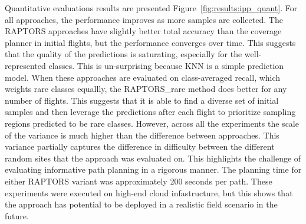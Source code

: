 Quantitative evaluations results are presented Figure~\ref{fig:results:ipp_quant}. For all approaches, the performance improves as more samples are collected. The RAPTORS approaches have slightly better total accuracy than the coverage planner in initial flights, but the performance converges over time. This suggests that the quality of the predictions is saturating, especially for the well-represented classes. This is un-surprising because KNN is a simple prediction model. When these approaches are evaluated on class-averaged recall, which weights rare classes equallly, the RAPTORS\_rare method does better for any number of flights. This suggests that it is able to find a diverse set of initial samples and then leverage the predictions after each flight to prioritize sampling regions predicted to be rare classes. However, across all the experiments the scale of the variance is much higher than the difference between approaches. This variance partially captures the difference in difficulty between the different random sites that the approach was evaluated on. This highlights the challenge of evaluating informative path planning in a rigorous manner. The planning time for either RAPTORS variant was approximately 200 seconds per path. These experiments were executed on high-end cloud infastructure, but this shows that the approach has potential to be deployed in a realistic field scenario in the future.

